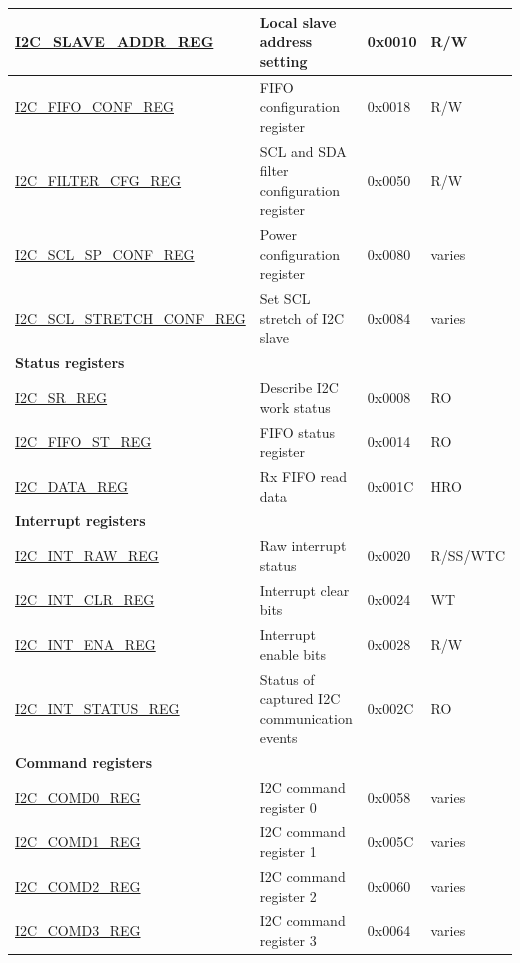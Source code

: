 \begin{longtable}{ | p{6cm} | p{7cm} | p{1.3cm} | p{1cm} | }
\hyperref[regdesc:I2CSLAVEADDRREG]{I2C\_SLAVE\_ADDR\_REG} & Local slave address setting & 0x0010 & R/W \\ \hline
\hyperref[regdesc:I2CFIFOCONFREG]{I2C\_FIFO\_CONF\_REG} & FIFO configuration register & 0x0018 & R/W \\ \hline
\hyperref[regdesc:I2CFILTERCFGREG]{I2C\_FILTER\_CFG\_REG} & SCL and SDA filter configuration register & 0x0050 & R/W \\ \hline
\hyperref[regdesc:I2CSCLSPCONFREG]{I2C\_SCL\_SP\_CONF\_REG} & Power configuration register & 0x0080 & varies \\ \hline
\hyperref[regdesc:I2CSCLSTRETCHCONFREG]{I2C\_SCL\_STRETCH\_CONF\_REG} & Set SCL stretch of I2C slave & 0x0084 & varies \\ \hline
\multicolumn{4}{|l|}{\textbf{Status registers}} \\ \hline
\hyperref[regdesc:I2CSRREG]{I2C\_SR\_REG} & Describe I2C work status & 0x0008 & RO \\ \hline
\hyperref[regdesc:I2CFIFOSTREG]{I2C\_FIFO\_ST\_REG} & FIFO status register & 0x0014 & RO \\ \hline
\hyperref[regdesc:I2CDATAREG]{I2C\_DATA\_REG} & Rx FIFO read data & 0x001C & HRO \\ \hline
\multicolumn{4}{|l|}{\textbf{Interrupt registers}} \\ \hline
\hyperref[regdesc:I2CINTRAWREG]{I2C\_INT\_RAW\_REG} & Raw interrupt status & 0x0020 & R/SS/WTC \\ \hline
\hyperref[regdesc:I2CINTCLRREG]{I2C\_INT\_CLR\_REG} & Interrupt clear bits & 0x0024 & WT \\ \hline
\hyperref[regdesc:I2CINTENAREG]{I2C\_INT\_ENA\_REG} & Interrupt enable bits & 0x0028 & R/W \\ \hline
\hyperref[regdesc:I2CINTSTATUSREG]{I2C\_INT\_STATUS\_REG} & Status of captured I2C communication events & 0x002C & RO \\ \hline
\multicolumn{4}{|l|}{\textbf{Command registers}} \\ \hline
\hyperref[regdesc:I2CCOMD0REG]{I2C\_COMD0\_REG} & I2C command register 0 & 0x0058 & varies \\ \hline
\hyperref[regdesc:I2CCOMD1REG]{I2C\_COMD1\_REG} & I2C command register 1 & 0x005C & varies \\ \hline
\hyperref[regdesc:I2CCOMD2REG]{I2C\_COMD2\_REG} & I2C command register 2 & 0x0060 & varies \\ \hline
\hyperref[regdesc:I2CCOMD3REG]{I2C\_COMD3\_REG} & I2C command register 3 & 0x0064 & varies \\ \hline

\end{longtable}
